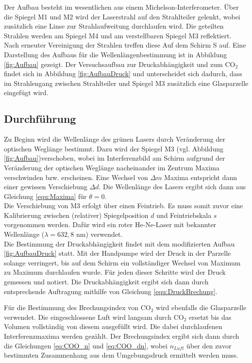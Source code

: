 \documentclass[12pt,a4paper]{article}
\begin{document}
Der Aufbau besteht im wesentlichen aus einem Michelson-Interferometer. Über die Spiegel M1 und M2 wird der Laserstrahl auf den Strahlteiler gelenkt, wobei zusätzlich eine Linse zur Strahlaufweitung durchlaufen wird. Die geteilten Strahlen werden am Spiegel M4 und am verstellbaren Spiegel M3 reflektiert. Nach erneuter Vereinigung der Strahlen treffen diese Auf dem Schirm S auf. Eine Darstellung des Aufbaus für die Wellenlängenbestimmung ist in Abbildung \ref{fig:Aufbau} gezeigt. Der Versuchsaufbau zur Druckabhängigkeit und zum $\text{CO}_2$ findet sich in Abbildung \ref{fig:AufbauDruck} und unterscheidet sich dadurch, dass im Strahlengang zwischen Strahlteiler und Spiegel M3 zusätzlich eine Glasparzelle eingefügt wird.

\subsection{Durchführung}


Zu Beginn wird die Wellenlänge des grünen Lasers durch Veränderung der optischen Weglänge bestimmt.
Dazu wird der Spiegel M3 (vgl. Abbildung \ref{fig:Aufbau})verschoben, wobei im Interferenzbild am Schirm aufgrund der Veränderung der optischen Weglänge nacheinander im Zentrum Maxima verschwinden bzw. erscheinen. Eine Wechsel von $\Delta m$ Maxima entspricht dann einer gewissen Verschiebung $\Delta d$. Die Wellenlänge des Lasers ergibt sich dann aus Gleichung \ref{equ:Maxima} für $\theta = 0$.\\

Die Verschiebung von M3 erfolgt über einen Feintrieb. Es muss somit zuvor eine Kalibrierung zwischen (relativer) Spiegelposition $d$ und Feintriebskala $s$ vorgenommen werden. Dafür wird ein roter He-Ne-Laser mit bekannter Wellenlänge ($\lambda = 632,8$ nm) verwendet.\\


Die Bestimmung der Druckabhängigkeit findet mit dem modifizierten Aufbau \ref{fig:AufbauDruck} statt. Mit der Handpumpe wird der Druck in der Parzelle solange verringert, bis auf dem Schirm ein vollständiger Wechsel von Maximum zu Maximum durchlaufen wurde. Für jeden dieser Schritte wird der Druck gemessen und notiert. Die Druckabhängigkeit ergibt sich dann durch entsprechende Auftragung mithilfe von Gleichung \ref{equ:DruckBrechung}.

Für die Bestimmung des Brechungsindex von $\text{CO}_2$ wird ebenfalls die Glasparzelle verwendet. Die eingeschlossene Luft wird langsam durch $\text{CO}_2$ ersetzt bis das Volumen vollständig von diesem ausgefüllt wird. Die dabei durchlaufenen Interferenzmaxima werden gezählt. Der Brechungsindex ergibt sich dann durch die Gleichungen \ref{eq:COO_n} und \ref{eq:COO_dn}, wobei $n_{Luft}$ über den zuvor bestimmten Zusammenhang aus dem Umgebungsdruck ermittelt werden muss.
\end{document}
